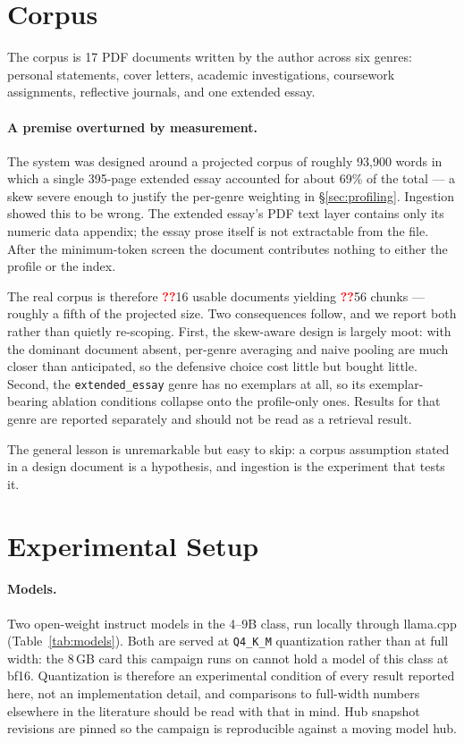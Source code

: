 \documentclass[11pt]{article}
\newcommand{\pending}[1][??]{\textcolor{red}{\textbf{#1}}}
\begin{document}
\section{Corpus}
\label{sec:corpus}

The corpus is 17 PDF documents written by the author across six genres:
personal statements, cover letters, academic investigations, coursework
assignments, reflective journals, and one extended essay.

\paragraph{A premise overturned by measurement.}
The system was designed around a projected corpus of roughly 93{,}900 words in
which a single 395-page extended essay accounted for about 69\% of the total ---
a skew severe enough to justify the per-genre weighting in
\S\ref{sec:profiling}. Ingestion showed this to be wrong. The extended essay's
PDF text layer contains only its numeric data appendix; the essay prose itself is
not extractable from the file. After the minimum-token screen the document
contributes nothing to either the profile or the index.

The real corpus is therefore \pending{16} usable documents yielding \pending{56}
chunks --- roughly a fifth of the projected size. Two consequences follow, and we
report both rather than quietly re-scoping. First, the skew-aware design is
largely moot: with the dominant document absent, per-genre averaging and naive
pooling are much closer than anticipated, so the defensive choice cost little but
bought little. Second, the \texttt{extended\_essay} genre has no exemplars at
all, so its exemplar-bearing ablation conditions collapse onto the
profile-only ones. Results for that genre are reported separately and should not
be read as a retrieval result.

The general lesson is unremarkable but easy to skip: a corpus assumption stated in
a design document is a hypothesis, and ingestion is the experiment that tests it.

\section{Experimental Setup}
\label{sec:setup}

\paragraph{Models.} Two open-weight instruct models in the 4--9B class, run
locally through llama.cpp (Table~\ref{tab:models}). Both are served at
\texttt{Q4\_K\_M} quantization rather than at full width: the 8\,GB card this
campaign runs on cannot hold a model of this class at bf16. Quantization is
therefore an experimental condition of every result reported here, not an
implementation detail, and comparisons to full-width numbers elsewhere in the
literature should be read with that in mind. Hub snapshot revisions are pinned
so the campaign is reproducible against a moving model hub.
\end{document}

